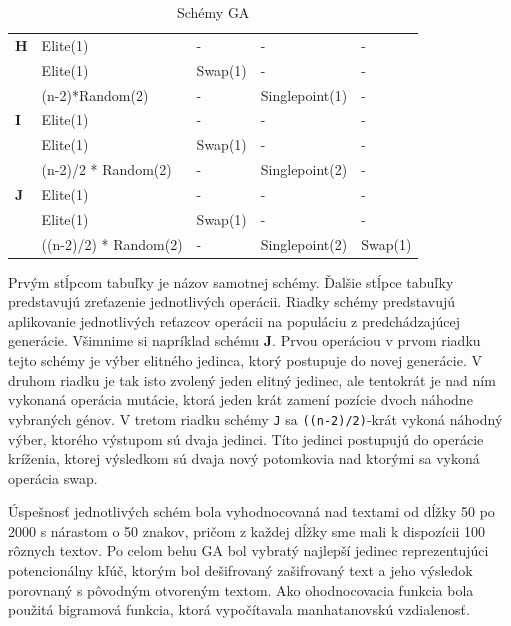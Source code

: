 \begin{table}[!htbp]
\begin{tabular}{@{}lllll@{}}
\textbf{H}      & Elite(1)                  & -                & -                 & -                    \\
                & Elite(1)                  & Swap(1)          & -                 & -                    \\
                & (n-2)*Random(2)           & -                & Singlepoint(1)    & -                    \\ \midrule
\textbf{I}      & Elite(1)                  & -                & -                 & -                    \\
                & Elite(1)                  & Swap(1)          & -                 & -                    \\
                & (n-2)/2 * Random(2)       & -                & Singlepoint(2)    & -                    \\ \midrule
\textbf{J}      & Elite(1)                  & -                & -                 & -                    \\
                & Elite(1)                  & Swap(1)          & -                 & -                    \\
                & ((n-2)/2) * Random(2)     & -                & Singlepoint(2)    & Swap(1)              \\ \bottomrule
\end{tabular}
\caption{Schémy GA}
\label{tab:schemy}
\end{table}

Prvým stĺpcom tabuľky je názov samotnej schémy. Ďalšie stĺpce tabuľky predstavujú zreťazenie jednotlivých operácii. Riadky schémy predstavujú aplikovanie jednotlivých reťazcov operácii na populáciu z predchádzajúcej generácie.
Všimnime si napríklad schému \textbf{J}.
Prvou operáciou v prvom riadku tejto schémy je výber elitného jedinca, ktorý postupuje do novej generácie.
V druhom riadku je tak isto zvolený jeden elitný jedinec, ale tentokrát je nad ním vykonaná operácia mutácie, ktorá jeden krát zamení pozície dvoch náhodne vybraných génov.
V tretom riadku schémy \texttt{J} sa \texttt{((n-2)/2)}-krát vykoná náhodný výber, ktorého výstupom sú dvaja jedinci. Títo jedinci postupujú do operácie kríženia,
ktorej výsledkom sú dvaja nový potomkovia nad ktorými sa vykoná operácia swap.

Úspešnosť jednotlivých schém bola vyhodnocovaná nad textami od dĺžky 50 po 2000 s nárastom o 50 znakov,
pričom z každej dĺžky sme mali k dispozícii 100 rôznych textov.
Po celom behu GA bol vybratý najlepší jedinec reprezentujúci potencionálny kľúč,
ktorým bol dešifrovaný zašifrovaný text a jeho výsledok porovnaný s pôvodným otvoreným textom.
Ako ohodnocovacia funkcia bola použitá bigramová funkcia, ktorá vypočítavala manhatanovskú vzdialenosť.

